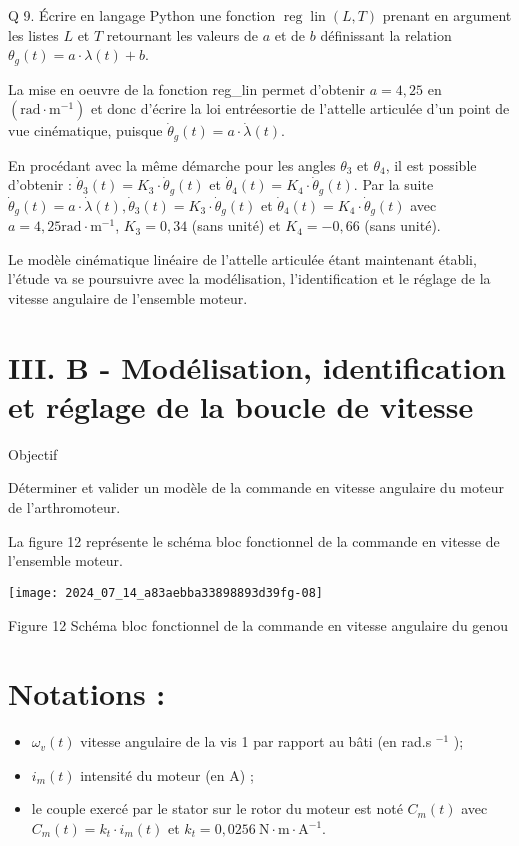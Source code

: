 Q 9. Écrire en langage Python une fonction $\operatorname{reg} \operatorname{lin}(L, T)$ prenant en argument les listes $L$ et $T$ retournant les valeurs de $a$ et de $b$ définissant la relation $\theta_{g}(t)=a \cdot \lambda(t)+b$.

La mise en oeuvre de la fonction reg\_lin permet d'obtenir $a=4,25$ en $\left(\mathrm{rad} \cdot \mathrm{m}^{-1}\right)$ et donc d'écrire la loi entréesortie de l'attelle articulée d'un point de vue cinématique, puisque $\dot{\theta}_{g}(t)=a \cdot \dot{\lambda}(t)$.

En procédant avec la même démarche pour les angles $\theta_{3}$ et $\theta_{4}$, il est possible d'obtenir : $\dot{\theta}_{3}(t)=K_{3} \cdot \dot{\theta}_{g}(t)$ et $\dot{\theta}_{4}(t)=K_{4} \cdot \dot{\theta}_{g}(t)$. Par la suite $\dot{\theta}_{g}(t)=a \cdot \dot{\lambda}(t), \dot{\theta}_{3}(t)=K_{3} \cdot \dot{\theta}_{g}(t)$ et $\dot{\theta}_{4}(t)=K_{4} \cdot \dot{\theta}_{g}(t)$ avec $a=4,25 \mathrm{rad} \cdot \mathrm{m}^{-1}$, $K_{3}=0,34$ (sans unité) et $K_{4}=-0,66$ (sans unité).

Le modèle cinématique linéaire de l'attelle articulée étant maintenant établi, l'étude va se poursuivre avec la modélisation, l'identification et le réglage de la vitesse angulaire de l'ensemble moteur.

\section*{III. B - Modélisation, identification et réglage de la boucle de vitesse}
Objectif

Déterminer et valider un modèle de la commande en vitesse angulaire du moteur de l'arthromoteur.

La figure 12 représente le schéma bloc fonctionnel de la commande en vitesse de l'ensemble moteur.

\begin{center}
\texttt{[image: 2024\_07\_14\_a83aebba33898893d39fg-08]}
\end{center}

Figure 12 Schéma bloc fonctionnel de la commande en vitesse angulaire du genou

\section*{Notations :}
\begin{itemize}
  \item $\omega_{v}(t)$ vitesse angulaire de la vis 1 par rapport au bâti (en rad.s ${ }^{-1}$ );

  \item $i_{m}(t)$ intensité du moteur (en A) ;

  \item le couple exercé par le stator sur le rotor du moteur est noté $C_{m}(t)$ avec $C_{m}(t)=k_{t} \cdot i_{m}(t)$ et $k_{t}=0,0256 \mathrm{~N} \cdot \mathrm{m} \cdot \mathrm{A}^{-1}$.

\end{itemize}

